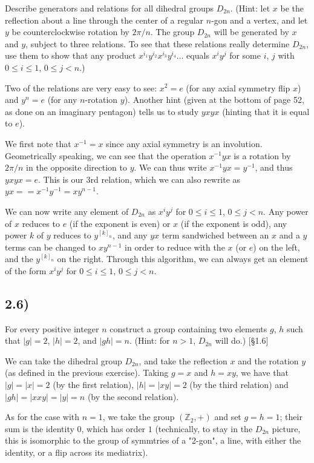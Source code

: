 \documentclass[12pt, letterpaper, twoside]{report}
\begin{document}
Describe generators and relations for all dihedral groups $D_{2n}$. (Hint: let $x$ be the reflection about a line through the center of a regular $n$-gon and a vertex, and let $y$ be counterclockwise rotation by $2\pi/n$. The group $D_{2n}$ will be generated by $x$ and $y$, subject to three relations. To see that these relations really determine $D_{2n}$, use them to show that any product $x^{i_1} y^{i_2} x^{i_3} y^{i_4} \ldots$ equals $x^i y^j$ for some $i$, $j$ with $0 \leq i \leq 1$, $0 \leq j < n$.)

Two of the relations are very easy to see: $x^2 = e$ (for any axial symmetry flip $x$) and $y^n = e$ (for any $n$-rotation $y$). Another hint (given at the bottom of page 52, as done on an imaginary pentagon) tells us to study $yxyx$ (hinting that it is equal to $e$).

We first note that $x^{-1} = x$ since any axial symmetry is an involution. Geometrically speaking, we can see that the operation $x^{-1}yx$ is a rotation by $2\pi/n$ in the opposite direction to $y$. We can thus write $x^{-1}yx = y^{-1}$, and thus $yxyx = e$. This is our 3rd relation, which we can also rewrite as $yx = = x^{-1}y^{-1} = xy^{n-1}$.

We can now write any element of $D_{2n}$ as $x^i y^j$ for $0 \leq i \leq 1$, $0 \leq j < n$. Any power of $x$ reduces to $e$ (if the exponent is even) or $x$ (if the exponent is odd), any power $k$ of $y$ reduces to $y^{[k]_n}$, and any $yx$ term sandwiched between an $x$ and a $y$ terms can be changed to $xy^{n-1}$ in order to reduce with the $x$ (or $e$) on the left, and the $y^{[k]_n}$ on the right. Through this algorithm, we can always get an element of the form $x^i y^j$ for $0 \leq i \leq 1$, $0 \leq j < n$.

\subsection*{2.6)}

For every positive integer $n$ construct a group containing two elements $g$, $h$ such that $|g| = 2$, $|h| = 2$, and $|gh| = n$. (Hint: for $n > 1$, $D_{2n}$ will do.) [§1.6]

We can take the dihedral group $D_{2n}$, and take the reflection $x$ and the rotation $y$ (as defined in the previous exercise). Taking $g = x$ and $h = xy$, we have that $|g| = |x| = 2$ (by the first relation), $|h| = |xy| = 2$ (by the third relation) and $|gh| = |xxy| = |y| = n$ (by the second relation).

As for the case with $n = 1$, we take the group $(\mathbb{Z}_2, +)$ and set $g = h = 1$; their sum is the identity $0$, which has order $1$ (technically, to stay in the $D_{2n}$ picture, this is isomorphic to the group of symmtries of a "2-gon", a line, with either the identity, or a flip across its mediatrix).
\end{document}
